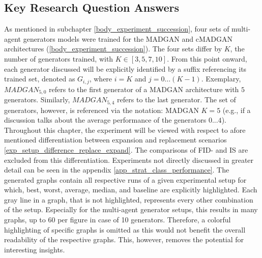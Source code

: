 \subsection{Key Research Question Answers} \label{exp_results_questions_answers}
As mentioned in subchapter \ref{body_experiment_succession}, four sets of multi-agent generators models were trained  for the MADGAN and cMADGAN architectures (\ref{body_experiment_succession}). The four sets differ by \(K\), the number of generators trained, with \(K \in [3, 5, 7, 10]\). From this point onward, each generator discussed will be explicitly identified by a suffix referencing its trained set, denoted as \(G_{i,j}\), where \(i = K\) and \(j = 0 \ldots (K - 1)\). Exemplary, \(MADGAN_{5,0}\) refers to the first generator of a MADGAN architecture with $5$ generators. Similarly, \(MADGAN_{5,4}\) refers to the last generator. The set of generators, however, is referenced via the notation: MADGAN \(K=5\) (e.g., if a discussion talks about the average performance of the generators \(0...4\)). Throughout this chapter, the experiment will be viewed with respect to afore mentioned differentiation between expansion and replacement scenarios \ref{exp_setup_difference_replace_expand}. The comparisons of FID- and IS are excluded from this differentiation. Experiments not directly discussed in greater detail can be seen in the appendix \ref{app_strat_class_performance}.
The generated graphs contain all respective runs of a given experimental setup for which, best, worst, average, median, and baseline are explicitly highlighted. Each gray line in a graph, that is not highlighted, represents every other combination of the setup. Especially for the multi-agent generator setups, this results in many graphs, up to $60$ per figure in case of 10 generators. Therefore, a colorful highlighting of specific graphs is omitted as this would not benefit the overall readability of the respective graphs. This, however, removes the potential for interesting insights.

\newpage
